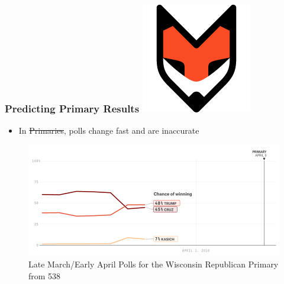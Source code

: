 \documentclass[xcolor=dvipsnames]{beamer}
\begin{document}
\begin{frame}
\frametitle{Predicting Primary Results \hfill \includegraphics[scale=.15]{fivethirtyeight-logo}}

\begin{itemize}
\item In \st{Primaries}, polls change fast and are inaccurate	
\end{itemize}


\begin{figure}
\includegraphics[scale=.35]{poll2.png}
\caption{Late March/Early April Polls for the Wisconsin Republican Primary from 538}
\end{figure}


\end{frame}
\end{document}
